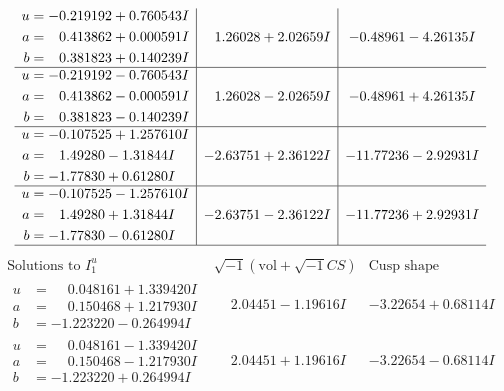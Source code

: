 \documentclass[1p]{elsarticle_modified}
\theoremstyle{definition}
\newcommand{\I}{\sqrt{-1}}
\begin{document}
$$\begin{array}{c|c|c}
\begin{aligned}
u &= -0.219192 + 0.760543 I \\
a &= \phantom{-}0.413862 + 0.000591 I \\
b &= \phantom{-}0.381823 + 0.140239 I\end{aligned}
 & \phantom{-}1.26028 + 2.02659 I & -0.48961 - 4.26135 I \\ \hline\begin{aligned}
u &= -0.219192 - 0.760543 I \\
a &= \phantom{-}0.413862 - 0.000591 I \\
b &= \phantom{-}0.381823 - 0.140239 I\end{aligned}
 & \phantom{-}1.26028 - 2.02659 I & -0.48961 + 4.26135 I \\ \hline\begin{aligned}
u &= -0.107525 + 1.257610 I \\
a &= \phantom{-}1.49280 - 1.31844 I \\
b &= -1.77830 + 0.61280 I\end{aligned}
 & -2.63751 + 2.36122 I & -11.77236 - 2.92931 I \\ \hline\begin{aligned}
u &= -0.107525 - 1.257610 I \\
a &= \phantom{-}1.49280 + 1.31844 I \\
b &= -1.77830 - 0.61280 I\end{aligned}
 & -2.63751 - 2.36122 I & -11.77236 + 2.92931 I\\
 \hline 
 \end{array}$$\newpage$$\begin{array}{c|c|c}  
\text{Solutions to }I^u_{1}& \I (\text{vol} + \sqrt{-1}CS) & \text{Cusp shape}\\
 \hline 
\begin{aligned}
u &= \phantom{-}0.048161 + 1.339420 I \\
a &= \phantom{-}0.150468 + 1.217930 I \\
b &= -1.223220 - 0.264994 I\end{aligned}
 & \phantom{-}2.04451 - 1.19616 I & -3.22654 + 0.68114 I \\ \hline\begin{aligned}
u &= \phantom{-}0.048161 - 1.339420 I \\
a &= \phantom{-}0.150468 - 1.217930 I \\
b &= -1.223220 + 0.264994 I\end{aligned}
 & \phantom{-}2.04451 + 1.19616 I & -3.22654 - 0.68114 I \\ \hline\begin{aligned}

\end{aligned}
\end{array}$$
\end{document}
